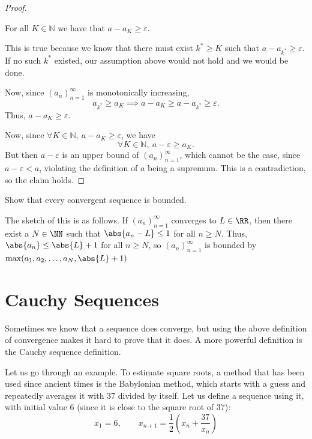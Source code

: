 \begin{exc}
\begin{solution}
\begin{proof}
	    \begin{claim}
	    For all $K \in \mathbb{N}$ we have that $a - a_K \geq \varepsilon.$
	    \end{claim}

	    This is true because we know that there must exist $k^* \geq K$ such that $a - a_{k^*} \geq \varepsilon$.
	    If no such $k^*$ existed, our assumption above would not hold and we would be done.

	    Now, since $(a_n)_{n=1}^{\infty}$ is monotonically increasing,
	    \[
	    a_{k^*} \geq a_K \implies a - a_K \geq a - a_{k^*} \geq \varepsilon.
	    \]
	    Thus, $a - a_K \geq \varepsilon$.

	    Now, since $\forall K \in \mathbb{N},\ a - a_K \geq \varepsilon$, we have
	    \[
	    \forall K \in \mathbb{N},\ a - \varepsilon \geq a_K.
	    \]
	    But then $a - \varepsilon$ is an upper bound of $(a_n)_{n=1}^{\infty}$, which cannot
	    be the case, since $a - \varepsilon < a$, violating the definition of $a$ being a
	    supremum. This is a contradiction, so the claim holds.
	    \end{proof}
	\end{solution}

	\begin{exercise}
	Show that every convergent sequence is bounded.
	\end{exercise}
	\begin{solution}
		The sketch of this is as follows. If $(a_n)_{n=1}^{\infty}$ converges to
		$L \in \RR$, then there exist a $N \in \NN$ such that $\abs{a_n - L} \leq 1$ for all
		$n \geq N$. Thus, $\abs{a_n} \leq \abs{L} + 1$ for all $n \geq N$, so $(a_n)_{n=1}^{\infty}$ is bounded
		by $\max(a_1, a_2, \dots, a_N, \abs{L} + 1)$
	\end{solution}
\end{exc}


\section{Cauchy Sequences}

Sometimes we know that a sequence does converge, but using the above definition of convergence
makes it hard to prove that it does. A more powerful definition is the Cauchy sequence definition.

Let us go through an example.
To estimate square roots, a method that has been used since
ancient times is the Babylonian method, which starts with a guess and
repeatedly averages it with $37$ divided by itself. Let us define a sequence using it,
with initial value $6$ (since it is close to the square root of $37$):
\[
x_1 = 6, \qquad x_{n+1} = \frac{1}{2}\left(x_n + \frac{37}{x_n}\right)
\]


